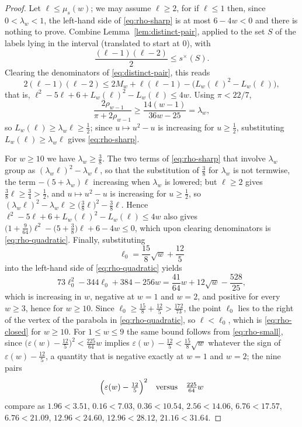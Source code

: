 \documentclass[11pt]{article}
\theoremstyle{definition}
\theoremstyle{remark}
\numberwithin{equation}{section}
\begin{document}
\begin{proof}
Let $\ell\le\mu_s(w)$; we may assume $\ell\ge2$, for if $\ell\le1$ then, since
$0<\lambda_w<1$, the left-hand side of \eqref{eq:rho-sharp} is at most
$6-4w<0$ and there is nothing to prove. Combine
Lemma~\ref{lem:distinct-pair}, applied to the set $S$ of the labels lying in the
interval (translated to start at $0$), with
\[
  \frac{(\ell-1)(\ell-2)}2\le s^{\times}(S).
\]
Clearing the denominators of \eqref{eq:distinct-pair}, this reads
\[
  2(\ell-1)(\ell-2)\le2M_w+\ell(\ell-1)-\bigl(L_w(\ell)^2-L_w(\ell)\bigr),
\]
that is, $\ell^2-5\ell+6+L_w(\ell)^2-L_w(\ell)\le4w$. Using $\pi<22/7$,
\[
  \frac{2\rho_{w-1}}{\pi+2\rho_{w-1}}
  \ge \frac{14(w-1)}{36w-25}=\lambda_w,
\]
so $L_w(\ell)\ge\lambda_w\ell\ge\tfrac12$; since $u\mapsto u^2-u$ is increasing for
$u\ge\tfrac12$, substituting $L_w(\ell)\ge\lambda_w\ell$ gives \eqref{eq:rho-sharp}.

For $w\ge10$ we have $\lambda_w\ge\tfrac38$. The two terms of
\eqref{eq:rho-sharp} that involve $\lambda_w$ group as
$(\lambda_w\ell)^2-\lambda_w\ell$, so that the substitution of $\tfrac38$ for
$\lambda_w$ is not termwise, the term $-(5+\lambda_w)\ell$ increasing when
$\lambda_w$ is lowered; but $\ell\ge2$ gives $\tfrac38\ell\ge\tfrac34>\tfrac12$,
and $u\mapsto u^2-u$ is increasing for $u\ge\tfrac12$, so
$(\lambda_w\ell)^2-\lambda_w\ell\ge\bigl(\tfrac38\ell\bigr)^2-\tfrac38\ell$. Hence
$\ell^2-5\ell+6+L_w(\ell)^2-L_w(\ell)\le4w$ also gives
$\bigl(1+\tfrac9{64}\bigr)\ell^2-\bigl(5+\tfrac38\bigr)\ell+6-4w\le0$, which upon
clearing denominators is \eqref{eq:rho-quadratic}. Finally, substituting
\[
  \ell_0=\frac{15}{8}\sqrt w+\frac{12}{5}
\]
into the left-hand side of \eqref{eq:rho-quadratic} yields
\[
  73\ell_0^2-344\ell_0+384-256w
  =\frac{41}{64}w+12\sqrt w-\frac{528}{25},
\]
which is increasing in $w$, negative at $w=1$ and $w=2$, and positive for every
$w\ge3$, hence for $w\ge10$. Since $\ell_0\ge\tfrac{15}8+\tfrac{12}5>\tfrac{172}{73}$,
the point $\ell_0$ lies to the right of the vertex of the parabola in
\eqref{eq:rho-quadratic}, so $\ell<\ell_0$, which is \eqref{eq:rho-closed} for
$w\ge10$. For $1\le w\le9$ the same
bound follows from \eqref{eq:rho-small}, since
$\bigl(\varepsilon(w)-\tfrac{12}5\bigr)^2<\tfrac{225}{64}w$ implies
$\varepsilon(w)-\tfrac{12}5<\tfrac{15}8\sqrt w$ whatever the sign of
$\varepsilon(w)-\tfrac{12}5$, a quantity that is negative exactly at $w=1$ and
$w=2$; the nine pairs
\[
  \Bigl(\varepsilon(w)-\tfrac{12}5\Bigr)^2
  \quad\text{versus}\quad
  \tfrac{225}{64}w
\]
compare as $1.96<3.51$, $0.16<7.03$, $0.36<10.54$, $2.56<14.06$, $6.76<17.57$,
$6.76<21.09$, $12.96<24.60$, $12.96<28.12$, $21.16<31.64$.
\end{proof}
\end{document}
